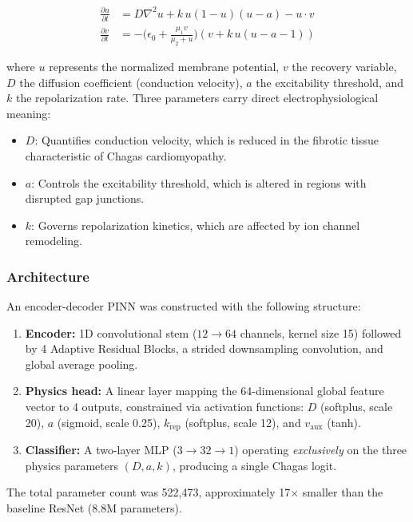 \begin{align}
    \frac{\partial u}{\partial t} &= D \nabla^2 u + k\, u(1 - u)(u - a) - u \cdot v \label{eq:ap_u} \\
    \frac{\partial v}{\partial t} &= -\bigl(\epsilon_0 + \frac{\mu_1 v}{\mu_2 + u}\bigr)(v + k\, u(u - a - 1)) \label{eq:ap_v}
\end{align}

where $u$ represents the normalized membrane potential, $v$ the recovery variable, $D$ the diffusion coefficient (conduction velocity), $a$ the excitability threshold, and $k$ the repolarization rate. Three parameters carry direct electrophysiological meaning:

\begin{itemize}
    \item $D$: Quantifies conduction velocity, which is reduced in the fibrotic tissue characteristic of Chagas cardiomyopathy.
    \item $a$: Controls the excitability threshold, which is altered in regions with disrupted gap junctions.
    \item $k$: Governs repolarization kinetics, which are affected by ion channel remodeling.
\end{itemize}

\subsubsection{Architecture}

An encoder-decoder PINN was constructed with the following structure:

\begin{enumerate}
    \item \textbf{Encoder:} 1D convolutional stem ($12 \to 64$ channels, kernel size 15) followed by 4 Adaptive Residual Blocks, a strided downsampling convolution, and global average pooling.
    \item \textbf{Physics head:} A linear layer mapping the 64-dimensional global feature vector to 4 outputs, constrained via activation functions: $D$ (softplus, scale 20), $a$ (sigmoid, scale 0.25), $k_{\text{rep}}$ (softplus, scale 12), and $v_{\text{aux}}$ (tanh).
    \item \textbf{Classifier:} A two-layer MLP ($3 \to 32 \to 1$) operating \textit{exclusively} on the three physics parameters $(D, a, k)$, producing a single Chagas logit.
\end{enumerate}

The total parameter count was 522,473, approximately 17$\times$ smaller than the baseline ResNet (8.8M parameters).

